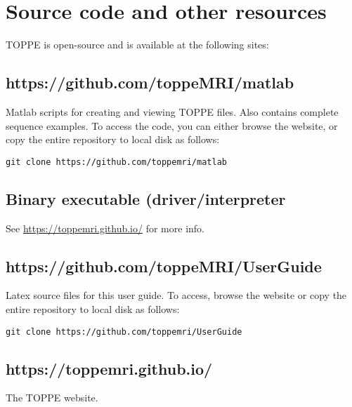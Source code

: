 \section{Source code and other resources}

TOPPE is open-source and is available at the following sites:

\subsection{https://github.com/toppeMRI/matlab}

Matlab scripts for creating and viewing TOPPE files. Also contains complete sequence examples.
To access the code, you can either browse the website, or copy the entire repository to local disk as follows:

\begin{lstlisting}
git clone https://github.com/toppemri/matlab
\end{lstlisting}


\subsection{Binary executable (driver/interpreter}

See \url{https://toppemri.github.io/} for more info.


\subsection{https://github.com/toppeMRI/UserGuide}

Latex source files for this user guide.
To access, browse the website or copy the entire repository to local disk as follows:
\begin{lstlisting}
git clone https://github.com/toppemri/UserGuide
\end{lstlisting}



\subsection{https://toppemri.github.io/}

The TOPPE website.





